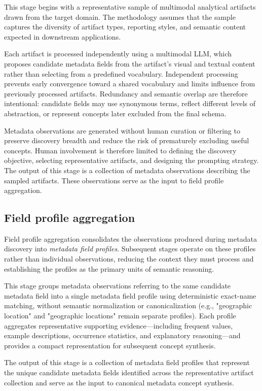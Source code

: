 \documentclass{article}
\begin{document}
This stage begins with a representative sample of multimodal analytical artifacts drawn from the target domain. The methodology assumes that the sample captures the diversity of artifact types, reporting styles, and semantic content expected in downstream applications.

Each artifact is processed independently using a multimodal LLM, which proposes candidate metadata fields from the artifact's visual and textual content rather than selecting from a predefined vocabulary. Independent processing prevents early convergence toward a shared vocabulary and limits influence from previously processed artifacts. Redundancy and semantic overlap are therefore intentional: candidate fields may use synonymous terms, reflect different levels of abstraction, or represent concepts later excluded from the final schema.

Metadata observations are generated without human curation or filtering to preserve discovery breadth and reduce the risk of prematurely excluding useful concepts. Human involvement is therefore limited to defining the discovery objective, selecting representative artifacts, and designing the prompting strategy. The output of this stage is a collection of metadata observations describing the sampled artifacts. These observations serve as the input to field profile aggregation.

\subsection{Field profile aggregation}

Field profile aggregation consolidates the observations produced during metadata discovery into \emph{metadata field profiles}. Subsequent stages operate on these profiles rather than individual observations, reducing the context they must process and establishing the profiles as the primary units of semantic reasoning.

This stage groups metadata observations referring to the same candidate metadata field into a single metadata field profile using deterministic exact-name matching, without semantic normalization or canonicalization (e.g., "geographic location" and "geographic locations" remain separate profiles). Each profile aggregates representative supporting evidence—including frequent values, example descriptions, occurrence statistics, and explanatory reasoning—and provides a compact representation for subsequent concept synthesis.

The output of this stage is a collection of metadata field profiles that represent the unique candidate metadata fields identified across the representative artifact collection and serve as the input to canonical metadata concept synthesis.
\end{document}
